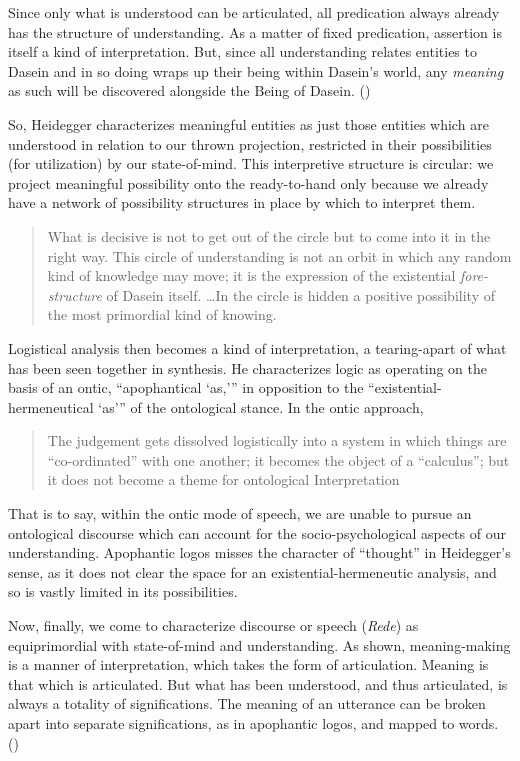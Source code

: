 \documentclass[leqno, 12pt]{turabian-researchpaper}
\begin{document}
	Since only what is understood can be articulated, all predication always already
	has the structure of understanding. As a matter of fixed predication, assertion
	is itself a kind of interpretation. But, since all understanding relates entities
	to Dasein and in so doing wraps up their being within Dasein's world, any
	\emph{meaning} as such will be discovered alongside the Being of Dasein. ()

	So, Heidegger characterizes meaningful entities as just those entities which are
	understood in relation to our thrown projection, restricted in their
	possibilities (for utilization) by our state-of-mind. This interpretive structure
	is circular: we project meaningful possibility onto the ready-to-hand only
	because we already have a network of possibility structures in place by which
	to interpret them. \blockquote[{}]{What is decisive is not to get out of the circle but to come into it in the right way. This circle of understanding is not an orbit in which any random kind of knowledge may move; it is the expression of the existential \emph{fore-structure} of Dasein itself. \dots In the circle is hidden a positive possibility of the most primordial kind of knowing.}

	Logistical analysis then becomes a kind of interpretation, a tearing-apart of what
	has been seen together in synthesis. He characterizes logic as operating on
	the basis of an ontic, \enquote{apophantical \enquote{as,}} in opposition to
	the \enquote{existential-hermeneutical \enquote{as}} of the ontological stance.
	In the ontic approach, \blockquote[{}]{The judgement gets dissolved logistically into a system in which things are \enquote{co-ordinated} with one another; it becomes the object of a \enquote{calculus}; but it does not become a theme for ontological Interpretation}.
	That is to say, within the ontic mode of speech, we are unable to pursue an
	ontological discourse which can account for the socio-psychological aspects of
	our understanding. Apophantic logos misses the character of \enquote{thought}
	in Heidegger's sense, as it does not clear the space for an existential-hermeneutic
	analysis, and so is vastly limited in its possibilities.

	Now, finally, we come to characterize discourse or speech (\textit{Rede}) as equiprimordial
	with state-of-mind and understanding. As shown, meaning-making is a manner of interpretation,
	which takes the form of articulation. Meaning is that which is articulated.
	But what has been understood, and thus articulated, is always a totality of
	significations. The meaning of an utterance can be broken apart into separate significations,
	as in apophantic logos, and mapped to words. ()
\end{document}

